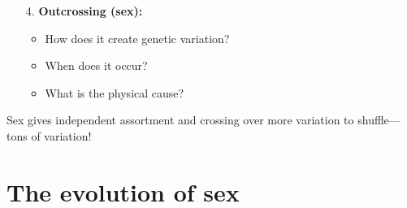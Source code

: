 \begin{frame}[t]
    \begin{adjustwidth}{-1.5em}{-1.5em}
        \begin{itemize}
            \item[4.] \textbf{Outcrossing (sex):}

                \begin{itemize}
                    \item How does it create genetic variation?


                        \vspace{3mm}
                    \item When does it occur?


                    \vspace{8mm}
                    \item What is the physical cause?

                \end{itemize}
        \end{itemize}

        \vspace{1.5cm}
        Sex gives independent assortment and crossing over more variation to
        shuffle---tons of variation!
    \end{adjustwidth}
\end{frame}


\section{The evolution of sex}

